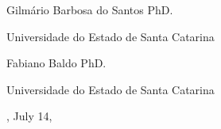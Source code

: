 \begin{folhadeaprovacao}
\begin{center}
        \vspace*{1.25cm}
        Gilmário Barbosa do Santos PhD. \par
        Universidade do Estado de Santa Catarina

		\vspace*{1.25cm}
        Fabiano Baldo PhD. \par
        Universidade do Estado de Santa Catarina

        
    \end{center}
    
    
    \vspace*{\fill}  
    \begin{center}
    {\imprimirlocal, July 14, \imprimirdata}
	\end{center}
    \vspace*{0.25cm}  
\end{folhadeaprovacao}




%	
%	
%	
%	
